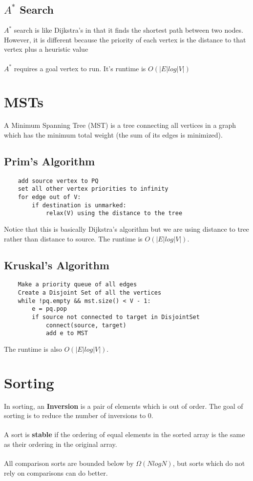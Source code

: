 \documentclass{article}
\begin{document}
\subsection{$A^*$ Search}
$A^*$ search is like Dijkstra's in that it finds the shortest path between two nodes.
However, it is different because the priority of each vertex is the distance to that vertex plus a heuristic value
\\\\
$A^*$ requires a goal vertex to run. It's runtime is $O(|E|log|V|)$
\section{MSTs}
A Minimum Spanning Tree (MST) is a tree connecting all vertices in a graph which has the minimum total weight (the sum of its edges is minimized).
\subsection{Prim's Algorithm}
\begin{lstlisting}
    add source vertex to PQ
    set all other vertex priorities to infinity
    for edge out of V:
        if destination is unmarked:
            relax(V) using the distance to the tree
\end{lstlisting}
Notice that this is basically Dijkstra's algorithm but we are using distance to tree rather than distance to source.
The runtime is $O(|E|log|V|)$.
\subsection{Kruskal's Algorithm}
\begin{lstlisting}
    Make a priority queue of all edges
    Create a Disjoint Set of all the vertices
    while !pq.empty && mst.size() < V - 1:
        e = pq.pop
        if source not connected to target in DisjointSet
            connect(source, target)
            add e to MST
\end{lstlisting}
The runtime is also $O(|E|log|V|)$.
\section{Sorting}
In sorting, an \textbf{Inversion} is a pair of elements which is out of order.
The goal of sorting is to reduce the number of inversions to 0.\\\\
A sort is \textbf{stable} if the ordering of equal elements in the sorted array is the same as their ordering in the original array.
\\\\
All comparison sorts are bounded below by $\Omega(NlogN)$, but sorts which do not rely on comparisons can do better.
\end{document}
